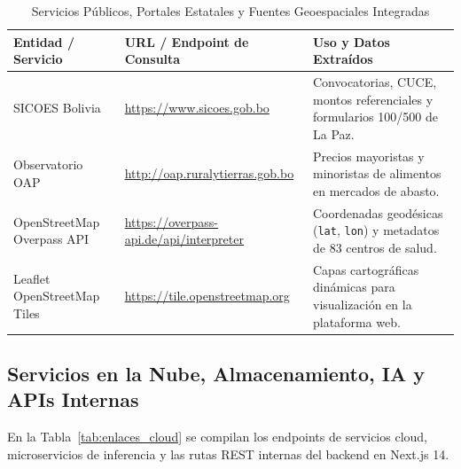 \begin{table}[htbp]
    \centering
    \small
    \caption{Servicios Públicos, Portales Estatales y Fuentes Geoespaciales Integradas}
    \label{tab:enlaces_gob}
    \begin{tabularx}{\linewidth}{>{\raggedright\arraybackslash}p{4.2cm} >{\raggedright\arraybackslash}p{5.6cm} L}
        \toprule
        \textbf{Entidad / Servicio} & \textbf{URL / Endpoint de Consulta} & \textbf{Uso y Datos Extraídos} \\
        \midrule
        SICOES Bolivia & \url{https://www.sicoes.gob.bo} & Convocatorias, CUCE, montos referenciales y formularios 100/500 de La Paz. \\
        Observatorio OAP & \url{http://oap.ruralytierras.gob.bo} & Precios mayoristas y minoristas de alimentos en mercados de abasto. \\
        OpenStreetMap Overpass API & \url{https://overpass-api.de/api/interpreter} & Coordenadas geodésicas (\nolinkurl{lat}, \nolinkurl{lon}) y metadatos de 83 centros de salud. \\
        Leaflet OpenStreetMap Tiles & \url{https://tile.openstreetmap.org} & Capas cartográficas dinámicas para visualización en la plataforma web. \\
        \bottomrule
    \end{tabularx}
\end{table}

\subsection{Servicios en la Nube, Almacenamiento, IA y APIs Internas}
En la Tabla~\ref{tab:enlaces_cloud} se compilan los endpoints de servicios cloud, microservicios de inferencia y las rutas REST internas del backend en Next.js 14.


